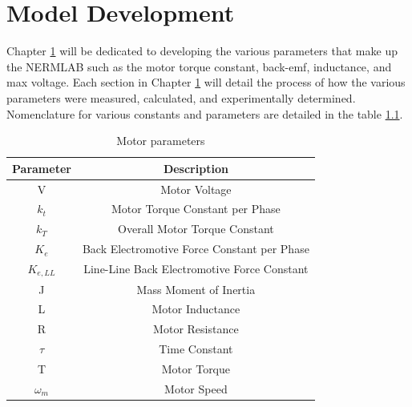 
\cleardoublepage


\chapter{Model Development}
\label{chp3}

Chapter \ref{chp3} will be dedicated to developing the various parameters that make up the NERMLAB such as the motor torque constant, \ac{back-emf}, inductance, and max voltage. Each section in Chapter \ref{chp3} will detail the process of how the various parameters were measured, calculated, and experimentally determined. Nomenclature for various constants and parameters are detailed in the table \ref{table2}.

\begin{table}[ht]
\begin{center}
\caption{Motor parameters}
\begin{tabular}[c]{|c|c|}

\hline
\textbf{Parameter} & \textbf{Description}\\

\hline
V & Motor Voltage\\

\hline
\(k_t\) & Motor Torque Constant per Phase\\

\hline
\(k_T\) & Overall Motor Torque Constant\\

\hline
\(K_e\) & Back Electromotive Force Constant per Phase\\

\hline
\(K_{e,LL}\) & Line-Line Back Electromotive Force Constant\\

\hline
J & Mass Moment of Inertia\\

\hline
L & Motor Inductance\\

\hline
R & Motor Resistance\\

\hline
\(\tau\) & Time Constant\\

\hline
T & Motor Torque\\
\hline
\(\omega_m\) & Motor Speed\\

\hline
\end{tabular}

\label{table2}
\end{center}
\end{table}

